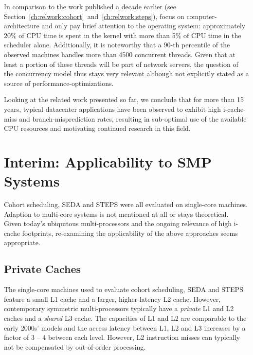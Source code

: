 \documentclass[12pt,a4paper]{book}
\begin{document}
In comparison to the work published a decade earlier (see Section~\ref{ch:relwork:cohort}~and~\ref{ch:relwork:steps}),
\citeauthor*{kanev2015profiling} focus on computer-architecture and only pay brief attention to the operating system:
approximately 20\% of CPU time is spent in the kernel with more than 5\% of CPU time in the scheduler alone.
Additionally, it is noteworthy that a 90-th percentile of the observed machines handles more than 4500 concurrent threads.
Given that at least a portion of these threads will be part of network servers, the question of the concurrency model thus stays very relevant although not explicitly stated as a source of performance-optimizations.~\cite{kanev2015profiling}

Looking at the related work presented so far, we conclude that for more than 15 years, typical datacenter applications have been observed to exhibit high i-cache-miss and branch-misprediction rates, resulting in sub-optimal use of the available CPU resources and motivating continued research in this field.

\section{Interim: Applicability to SMP Systems}\label{ch:relwork:anasmp}
Cohort scheduling, SEDA and STEPS were all evaluated on single-core machines.
Adaption to multi-core systems is not mentioned at all or stays theoretical.~\cite{steps,harizopoulos2003case}
Given today's ubiquitous multi-processors and the ongoing relevance of high i-cache footprints, re-examining the applicability of the above approaches seems appropriate.

\subsection{Private Caches}
The single-core machines used to evaluate cohort scheduling, SEDA and STEPS feature a small L1 cache and a larger, higher-latency L2 cache.
However, contemporary symmetric multi-processors typically have a \emph{private} L1 and L2 caches and a \emph{shared} L3 cache.
The capacities of L1 and L2 are comparable to the early 2000s' models and the access latency between L1, L2 and L3 increases by a factor of 3 -- 4 between each level.
However, L2 instruction misses can typically not be compensated by out-of-order processing.~\cite{hennessy2002,haswellCacheLatency} %
\end{document}

